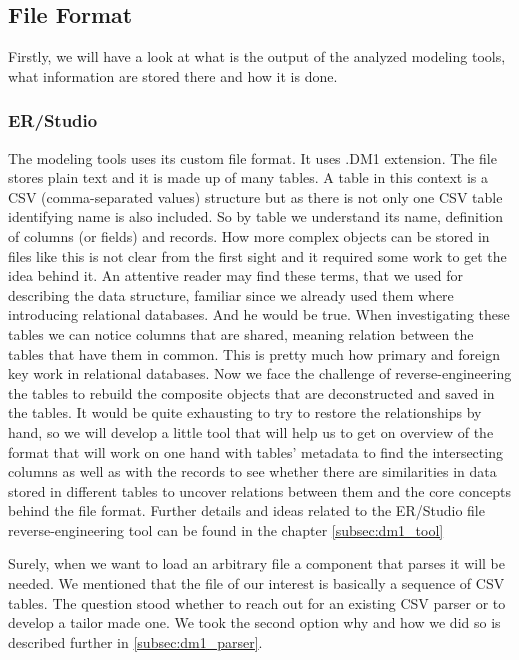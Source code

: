 \subsection{File Format}

Firstly, we will have a look at what is the output of the analyzed modeling tools, what information are stored there and how it is done.

\subsubsection{ER/Studio}
\label{subsec:dm1_format}
The modeling tools uses its custom file format. It uses .DM1 extension. The file stores plain text and it is made up of many tables. A table in this context is a CSV (comma-separated values) structure but as there is not only one CSV table identifying name is also included. So by table we understand its name, definition of columns (or fields) and records. 
How more complex objects can be stored in files like this is not clear from the first sight and it required some work to get the idea behind it.  
An attentive reader may find these terms, that we used for describing the data structure, familiar since we already used them where introducing relational databases. And he would be true. When investigating these tables we can notice columns that are shared, meaning relation between the tables that have them in common. This is pretty much how primary and foreign key work in relational databases.
Now we face the challenge of reverse-engineering the tables to rebuild the composite objects that are deconstructed and saved in the tables.
It would be quite exhausting to try to restore the relationships by hand, so we will develop a little tool that will help us to get on overview of the format that will work on one hand with tables' metadata to find the intersecting columns as well as with the records to see whether there are similarities in data stored in different tables to uncover relations between them and the core concepts behind the file format.
Further details and ideas related to the ER/Studio file reverse-engineering tool can be found in the chapter \autoref{subsec:dm1_tool}

Surely, when we want to load an arbitrary file a component that parses it will be needed. 
We mentioned that the file of our interest is basically a sequence of CSV tables. The question stood whether to reach out for an existing CSV parser or to develop a tailor made one. We took the second option why and how we did so is described further in  \autoref{subsec:dm1_parser}.

